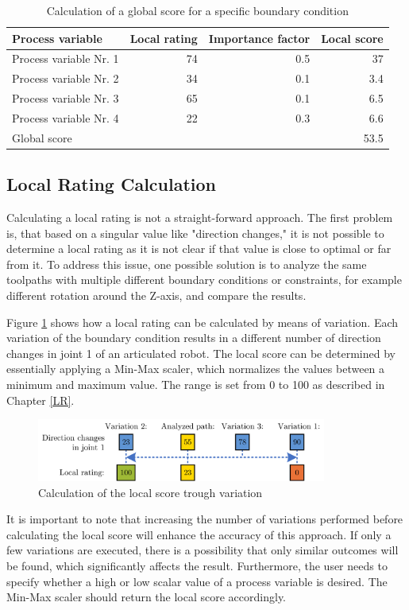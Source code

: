 \begin{table}[H]
	\centering
	\begin{tabular}{||l|r|r|r||}
		Process variable & Local rating & Importance factor& Local score\\
		\hline
		\hline
		\hline
		
		Process variable Nr. 1 & 74 & 0.5 & 37\\
		Process variable Nr. 2 & 34& 0.1&3.4\\
		Process variable Nr. 3 & 65& 0.1&6.5\\
		Process variable Nr. 4 & 22&0.3&6.6\\
		\hline
		\hline
		\hline
		Global score& & &53.5\\
		\hline
		\hline
	\end{tabular}
	
	\caption{Calculation of a global score for a specific boundary condition}
	\label{weighting}
\end{table}


\subsection{Local Rating Calculation}\label{LRC}
Calculating a local rating is not a straight-forward approach. The first problem is, that based on a singular value like "direction changes," it is not possible to determine a local rating as it is not clear if that value is close to optimal or far from it. To address this issue, one possible solution is to analyze the same toolpaths with multiple different boundary conditions or constraints, for example different rotation around the Z-axis, and compare the results.

Figure \ref{Localscore} shows how a local rating can be calculated by means of variation. Each variation  of the boundary condition results in a different number of direction changes in joint 1 of an articulated robot. The local score can be determined by essentially applying a Min-Max scaler, which normalizes the values between a minimum and maximum value. The range is set from 0 to 100 as described in Chapter \ref{LR}.

\begin{figure}[H]
	\centerline{\includegraphics[width=0.85\textwidth]{figures/localscore.png}}
	\caption{Calculation of the local score trough variation}
	\label{Localscore}
\end{figure}
\newpage
It is important to note that increasing the number of variations performed before calculating the local score will enhance the accuracy of this approach. If only a few variations are executed, there is a possibility that only similar outcomes will be found, which significantly affects the result. Furthermore, the user needs to specify whether a high or low scalar value of a process variable is desired. The Min-Max scaler should return the local score accordingly. 

